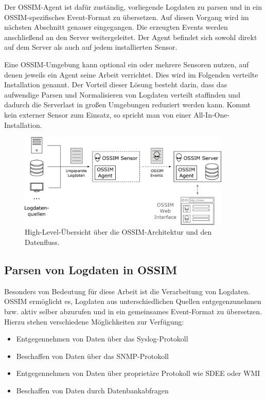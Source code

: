 Der OSSIM-Agent ist dafür zuständig, vorliegende Logdaten zu parsen und in ein OSSIM-spezifisches Event-Format zu übersetzen. Auf diesen Vorgang wird im nächsten Abschnitt genauer eingegangen. Die erzeugten Events werden anschließend an den Server weitergeleitet. Der Agent befindet sich sowohl direkt auf dem Server als auch auf jedem installierten Sensor. 

Eine OSSIM-Umgebung kann optional ein oder mehrere Sensoren nutzen, auf denen jeweils ein Agent seine Arbeit verrichtet. Dies wird im Folgenden verteilte Installation genannt. Der Vorteil dieser Lösung besteht darin, dass das aufwendige Parsen und Normalisieren von Logdaten verteilt staffinden und dadurch die Serverlast in großen Umgebungen reduziert werden kann. Kommt kein externer Sensor zum Einsatz, so spricht man von einer All-In-One-Installation.

\begin{figure}[]
    \centering
        \includegraphics[width=0.9\textwidth]{dia/ossim_log_flow.pdf}
    \caption{High-Level-Übersicht über die OSSIM-Architektur und den Datenfluss.}
    \label{fig:ossim_log_flow}
\end{figure}


\subsection*{Parsen von Logdaten in OSSIM}

Besonders von Bedeutung für diese Arbeit ist die Verarbeitung von Logdaten. OSSIM ermöglicht es, Logdaten aus unterschiedlichen Quellen entgegenzunehmen bzw. aktiv selber abzurufen und in ein gemeinsames Event-Format zu übersetzen. Hierzu stehen verschiedene Möglichkeiten zur Verfügung:

\begin{itemize}
  \item Entgegennehmen von Daten über das Syslog-Protokoll
  \item Beschaffen von Daten über das SNMP-Protokoll
  \item Entgegennehmen von Daten über proprietäre Protokoll wie SDEE oder WMI
  \item Beschaffen von Daten durch Datenbankabfragen 
\end{itemize}

